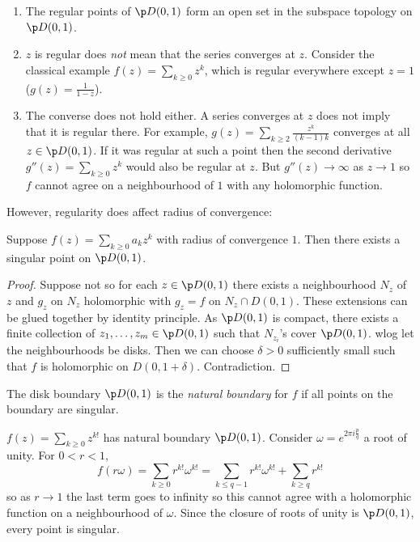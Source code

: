 \documentclass[a4paper]{article}
\begin{document}
\begin{remark}\leavevmode
  \begin{enumerate}
  \item The regular points of \(\p D(0, 1)\) form an open set in the subspace topology on \(\p D(0, 1)\).
  \item \(z\) is regular does \emph{not} mean that the series converges at \(z\). Consider the classical example \(f(z) = \sum_{k \geq 0} z^k\), which is regular everywhere except \(z = 1\) (\(g(z) = \frac{1}{1 - z}\)).
  \item The converse does not hold either. A series converges at \(z\) does not imply that it is regular there. For example, \(g(z) = \sum_{k \geq 2} \frac{z^k}{(k - 1)k}\) converges at all \(z \in \p D(0, 1)\). If it was regular at such a point then the second derivative \(g''(z) = \sum_{k \geq 0} z^k\) would also be regular at \(z\). But \(g''(z) \to \infty\) as \(z \to 1\) so \(f\) cannot agree on a neighbourhood of \(1\) with any holomorphic function.
  \end{enumerate}
\end{remark}

However, regularity does affect radius of convergence:
\begin{proposition}
  Suppose \(f(z) = \sum_{k \geq 0} a_kz^k\) with radius of convergence \(1\). Then there exists a singular point on \(\p D(0, 1)\).
\end{proposition}

\begin{proof}
  Suppose not so for each \(z \in \p D(0, 1)\) there exists a neighbourhood \(N_z\) of \(z\) and \(g_z\) on \(N_z\) holomorphic with \(g_z = f\) on \(N_z \cap D(0, 1)\). These extensions can be glued together by identity principle. As \(\p D(0, 1)\) is compact, there exists a finite collection of \(z_1, \dots, z_m \in \p D(0, 1)\) such that \(N_{z_i}\)'s cover \(\p D(0, 1)\). wlog let the neighbourhoods be disks. Then we can choose \(\delta > 0\) sufficiently small such that \(f\) is holomorphic on \(D(0, 1 + \delta)\). Contradiction.
\end{proof}

\begin{definition}
  The disk boundary \(\p D(0, 1)\) is the \emph{natural boundary} for \(f\) if all points on the boundary are singular.
\end{definition}

\begin{eg}
  \(f(z) = \sum_{k \geq 0} z^{k!}\) has natural boundary \(\p D(0, 1)\). Consider \(\omega = e^{2\pi i \frac{p}{q}}\) a root of unity. For \(0 < r < 1\),
  \[
    f(r \omega)
    = \sum_{k \geq 0} r^{k!} \omega^{k!}
    = \sum_{k \leq q - 1} r^{k!} \omega^{k!} + \sum_{k \geq q} r^{k!}
  \]
  so as \(r \to 1\) the last term goes to infinity so this cannot agree with a holomorphic function on a neighbourhood of \(\omega\). Since the closure of roots of unity is \(\p D(0, 1)\), every point is singular.
\end{eg}






\printindex
\end{document}
